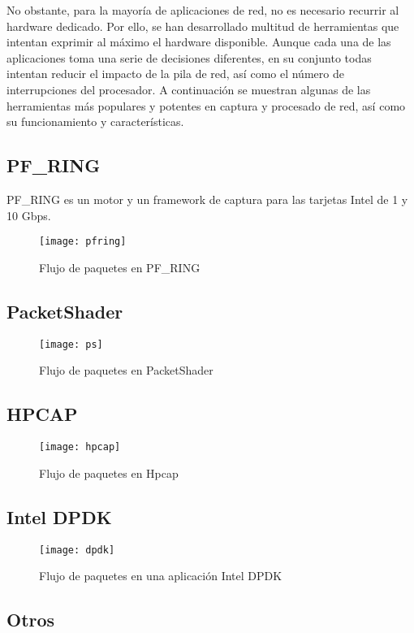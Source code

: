  No obstante, para la mayoría de aplicaciones de red, no es necesario recurrir al hardware dedicado. Por ello, se han desarrollado multitud de herramientas que intentan exprimir al máximo el hardware disponible. Aunque cada una de las aplicaciones toma una serie de decisiones diferentes, en su conjunto todas intentan reducir el impacto de la pila de red, así como el número de interrupciones del procesador. A continuación se muestran algunas de las herramientas más populares y potentes en captura y procesado de red, así como su funcionamiento y características.
 
\subsection{PF\_RING}
PF\_RING es un motor y un framework de captura para las tarjetas Intel de 1 y 10 Gbps.

\begin{figure}[!th]
\centering
\texttt{[image: pfring]}
\caption{Flujo de paquetes en PF\_RING}
\label{fig:flow:pfring}
\end{figure}

\subsection{PacketShader}

\begin{figure}[!th]
\centering
\texttt{[image: ps]}
\caption{Flujo de paquetes en PacketShader}
\label{fig:flow:ps}
\end{figure}

\subsection{HPCAP}

\begin{figure}[!th]
\centering
\texttt{[image: hpcap]}
\caption{Flujo de paquetes en Hpcap}
\label{fig:flow:hpcap}
\end{figure}

\subsection{Intel DPDK}

\begin{figure}[!th]
\centering
\texttt{[image: dpdk]}
\caption{Flujo de paquetes en una aplicación Intel DPDK}
\label{fig:flow:dpdk}
\end{figure}


\subsection{Otros}




